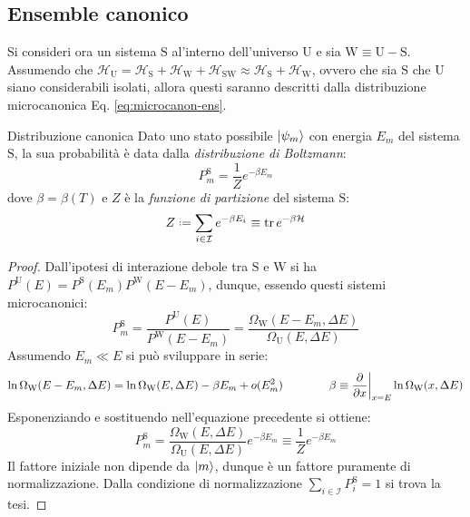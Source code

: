\subsection{Ensemble canonico}

Si consideri ora un sistema $ \text{S} $ al'interno dell'universo $ \text{U} $ e sia $ \text{W} \equiv \text{U} - \text{S} $. Assumendo che $ \mathcal{H}_\text{U} = \mathcal{H}_\text{S} + \mathcal{H}_\text{W} + \mathcal{H}_\text{SW} \approx \mathcal{H}_\text{S} + \mathcal{H}_\text{W} $, ovvero che sia $ \text{S} $ che $ \text{U} $ siano considerabili isolati, allora questi saranno descritti dalla distribuzione microcanonica Eq. \ref{eq:microcanon-ens}.

\begin{theorem}{Distribuzione canonica}{}
	Dato uno stato possibile $ \ket{\psi_m} $ con energia $ E_m $ del sistema $ \text{S} $, la sua probabilità è data dalla \textit{distribuzione di Boltzmann}:
	\begin{equation}
		P_m^\text{S} = \frac{1}{Z} e^{- \beta E_m}
	\end{equation}
	dove $ \beta = \beta(T) $ e $ Z $ è la \textit{funzione di partizione} del sistema $ \text{S} $:
	\begin{equation}
		Z \defeq \sum_{i \in \mathcal{I}} e^{- \beta E_i} \equiv \tr e^{- \beta \mathcal{H}}
		\label{eq:part-func-states}
	\end{equation}

	\tcblower

	\begin{proof}
		Dall'ipotesi di interazione debole tra $ \text{S} $ e $ \text{W} $ si ha $ P^\text{U}(E) = P^\text{S}(E_m) P^\text{W}(E - E_m) $, dunque, essendo questi sistemi microcanonici:
		\begin{equation*}
			P_m^\text{S} = \frac{P^\text{U}(E)}{P^\text{W}(E-E_m)} = \frac{\Omega_\text{W}(E-E_m,\Delta E)}{\Omega_\text{U}(E,\Delta E)}
		\end{equation*}
		Assumendo $ E_m \ll E $ si può sviluppare in serie:
		\begin{equation*}
			\ln \Omega_\text{W}(E - E_m , \Delta E) = \ln \Omega_\text{W}(E , \Delta E) - \beta E_m + o(E_m^2)
			\qquad \qquad
			\beta \equiv \frac{\partial}{\partial x}\bigg\vert_{x = E} \ln \Omega_\text{W}(x , \Delta E)
		\end{equation*}
		Esponenziando e sostituendo nell'equazione precedente si ottiene:
		\begin{equation*}
			P_m^\text{S} = \frac{\Omega_\text{W}(E , \Delta E)}{\Omega_\text{U}(E, \Delta E)} e^{- \beta E_m} \equiv \frac{1}{Z} e^{- \beta E_m}
		\end{equation*}
		Il fattore iniziale non dipende da $ \ket{m} $, dunque è un fattore puramente di normalizzazione. Dalla condizione di normalizzazione $ \sum_{i \in \mathcal{I}} P_i^\text{S} = 1 $ si trova la tesi.
	\end{proof}
\end{theorem}

